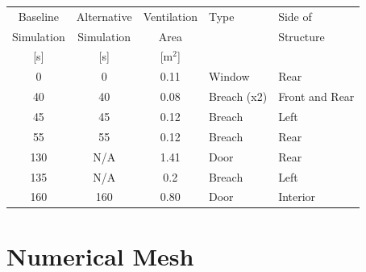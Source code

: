 \documentclass[12pt,oneside]{book}
\begin{document}
\begin{table}
\centering
{}\label{tab:vents}
\begin{tabular}{cccll}
\toprule[1.5pt]
Baseline    &  Alternative  &  Ventilation  &  Type         &  Side of         \\
Simulation  &  Simulation   &  Area         &               &  Structure       \\
{[s]}       &  {[s]}        &  [m$^2$]      &               &                  \\
\midrule
0           &  0            &  0.11         &  Window       &  Rear            \\
40          &  40           &  0.08         &  Breach (x2)  &  Front and Rear  \\
45          &  45           &  0.12         &  Breach       &  Left            \\
55          &  55           &  0.12         &  Breach       &  Rear            \\
130         &  N/A          &  1.41         &  Door         &  Rear            \\
135         &  N/A          &  0.2          &  Breach       &  Left            \\
160         &  160          &  0.80         &  Door         &  Interior        \\
\bottomrule[1.25pt]
\end{tabular}\par
\end{table}

\section{Numerical Mesh}
\label{mesh}
\end{document}
